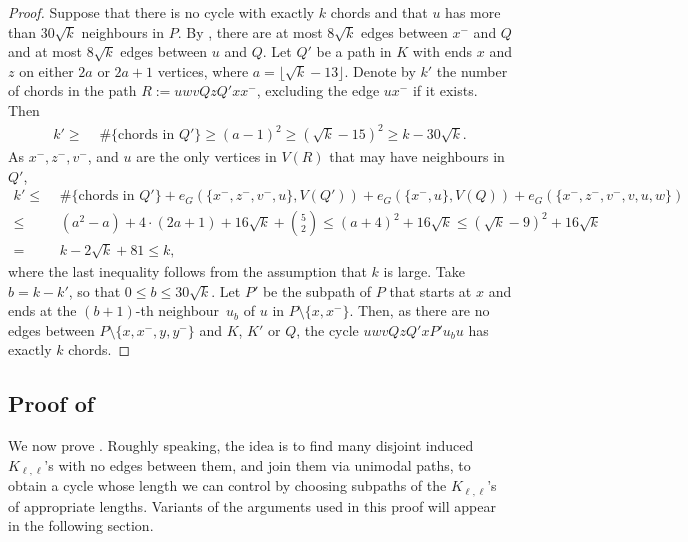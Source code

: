 \documentclass[11pt,english]{article}
\theoremstyle{plain}
\theoremstyle{definition}
\theoremstyle{remark}
\newcommand{\floor}[1]{
    \lfloor #1 \rfloor
}
\begin{document}
\begin{proof}
        Suppose that there is no cycle with exactly $k$ chords and that $u$ has more than $30 \sqrt{k}$ neighbours in $P$.
        By , there are at most $8\sqrt{k}$ edges between $x^-$ and $Q$ and at most $8\sqrt{k}$ edges between $u$ and $Q$.
        Let $Q'$ be a path in $K$ with ends $x$ and $z$ on either $2a$ or $2a+1$ vertices, where $a = \floor{\sqrt{k} - 13}$.
        Denote by $k'$ the number of chords in the path $R := uw vQz Q' x x^-$, excluding the edge $u x^-$ if it exists. 
        Then 
        \begin{align*}
            k' \ge \,\, & \#\{\text{chords in $Q'$}\} \ge (a-1)^2 \ge (\sqrt{k} - 15)^2 \ge k - 30 \sqrt{k}.
        \end{align*}
        As $x^-, z^-, v^-$, and $u$ are the only vertices in $V(R)$ that may have neighbours in $Q'$,
        \begin{align*}
            k' \leq \,\, & \#\{\text{chords in $Q'$}\} + e_G(\{x^-, z^-, v^-, u\}, V(Q')) + 
             e_G(\{x^-, u\}, V(Q)) + e_G(\{x^-, z^-, v^-, v, u, w\}) \\
            \le \,\, & (a^2 - a) + 4 \cdot (2a + 1) + 16 \sqrt{k} + \binom{5}{2}  
            \le (a + 4)^2 + 16\sqrt{k} \le (\sqrt{k} - 9)^2 + 16\sqrt{k}\\
            = \,\, & k - 2 \sqrt{k} + 81 \le k, 
        \end{align*}
        where the last inequality follows from the assumption that $k$ is large.
        Take $b = k - k'$, so that $0 \le b \le 30 \sqrt{k}$.
        Let $P'$ be the subpath of $P$ that starts at $x$ and ends at the $(b+1)$-th neighbour~$u_b$ of $u$ in $P \setminus \{x, x^-\}$. Then, as there are no edges between $P \setminus \{x, x^-, y, y^-\}$ and $K$, $K'$ or $Q$,
        the cycle $uwvQzQ'xP'u_b u$ has exactly $k$ chords.
    \end{proof}

    \subsection{Proof of }	 \label{subsec:finding-cycle-almost-k}
    
    We now prove . Roughly speaking, the idea is to find many disjoint induced $K_{\ell, \ell}$'s with no edges between them, and join them via unimodal paths, to obtain a cycle whose length we can control by choosing subpaths of the $K_{\ell, \ell}$'s of appropriate lengths. Variants of the arguments used in this proof will appear in the following section.
\end{document}
